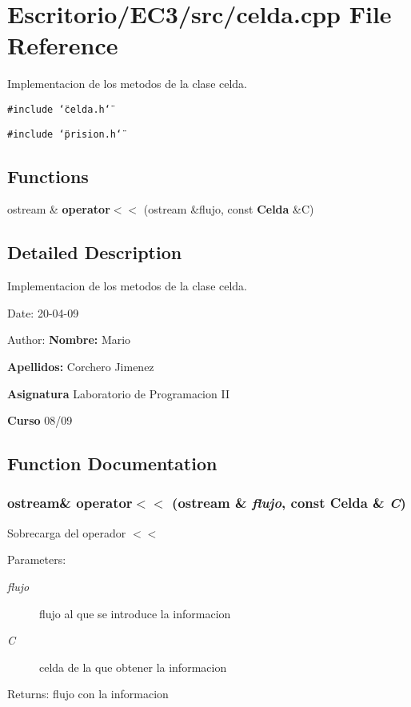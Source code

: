 \section{Escritorio/EC3/src/celda.cpp File Reference}
\label{celda_8cpp}
Implementacion de los metodos de la clase celda. 

{\tt \#include \char`\"{}celda.h\char`\"{}}\par
{\tt \#include \char`\"{}prision.h\char`\"{}}\par
\subsection*{Functions}
\begin{CompactItemize}
\item 
ostream \& {\bf operator$<$$<$} (ostream \&flujo, const {\bf Celda} \&C)
\end{CompactItemize}


\subsection{Detailed Description}
Implementacion de los metodos de la clase celda. 

\begin{Desc}
\item[Date:]20-04-09 \end{Desc}
\begin{Desc}
\item[Author:]{\bf Nombre:} Mario \par
 {\bf Apellidos:} Corchero Jimenez \par
 {\bf Asignatura} Laboratorio de Programacion II \par
 {\bf Curso} 08/09 \end{Desc}


\subsection{Function Documentation}
\subsubsection{\setlength{\rightskip}{0pt plus 5cm}ostream\& operator$<$$<$ (ostream \& {\em flujo}, const {\bf Celda} \& {\em C})}\label{celda_8cpp_1ae028893035e539215673ec05256b71}


Sobrecarga del operador $<$$<$ \begin{Desc}
\item[Parameters:]
\begin{description}
\item[{\em flujo}]flujo al que se introduce la informacion \item[{\em C}]celda de la que obtener la informacion \end{description}
\end{Desc}
\begin{Desc}
\item[Returns:]flujo con la informacion \end{Desc}
